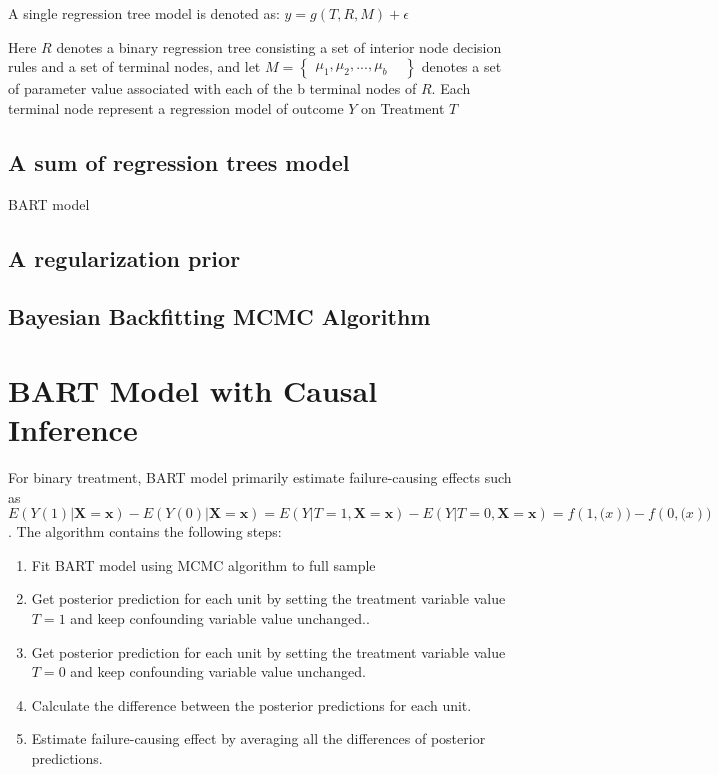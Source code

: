 A single regression tree model is denoted as:
$
y=g(T, R, M)+\epsilon
$

Here $R$ denotes a binary regression tree consisting a set of interior node decision rules and a set of terminal nodes, and let $M=
\begin{Bmatrix}
 \mu _1, \mu _2, . . ., \mu _b   & 
\end{Bmatrix}$
denotes a set of parameter value associated with each of the b terminal nodes of $R$. Each terminal node represent a regression model of outcome $Y$ on Treatment $T$


\subsection{A sum of regression trees model}
BART model 
\subsection{A regularization prior}

\subsection{Bayesian Backfitting MCMC Algorithm}


\section{BART Model with Causal Inference}\label{BARTcausal}%

For binary treatment, BART model primarily estimate failure-causing effects such as $E(Y(1)|\pmb{X}=\pmb{x}) - E(Y(0)|\pmb{X}=\pmb{x})=E(Y|T=1, \pmb{X}=\pmb{x})-E(Y|T=0, \pmb{X}=\pmb{x})=f(1,\pmb(x))-f(0,\pmb(x))$ . The algorithm contains the following steps:
\begin{enumerate}
\item Fit BART model using MCMC algorithm to full sample
\item Get posterior prediction for each unit by setting the treatment variable value $T=1$ and keep confounding variable value unchanged..
\item Get posterior prediction for each unit by setting the treatment variable value $T=0$ and keep confounding variable value unchanged.
\item	Calculate the difference between the posterior predictions for each unit.
\item Estimate failure-causing effect by averaging all the differences of posterior predictions. 
\end{enumerate}

